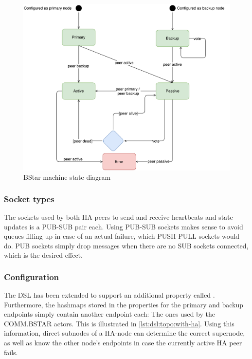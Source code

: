 \begin{figure}[]
	\includegraphics[width=\textwidth]{img/state_machine_diagram_bstar.pdf}
	\caption{BStar machine state diagram}
	\label{fig:bstar:state}
\end{figure}

\subsubsection{Socket types}
The sockets used by both HA peers to send and receive heartbeats and state
updates is a PUB-SUB pair each. Using PUB-SUB sockets makes sense to avoid queues filling up
in case of an actual failure, which PUSH-PULL sockets would do. PUB sockets simply drop messages when there are
no SUB sockets connected, which is the desired effect.


\subsubsection{Configuration}
The DSL has been extended to support an additional property called
. Furthermore, the hashmaps stored in the properties for
the primary and backup endpoints simply contain another endpoint each: The ones
used by the COMM.BSTAR actors. This is illustrated in \autoref{lst:dsl:topo:with-ha}.
Using this information, direct subnodes of a HA-node can determine the correct
supernode, as well as know the other node's endpoints in case the currently
active HA peer fails.



